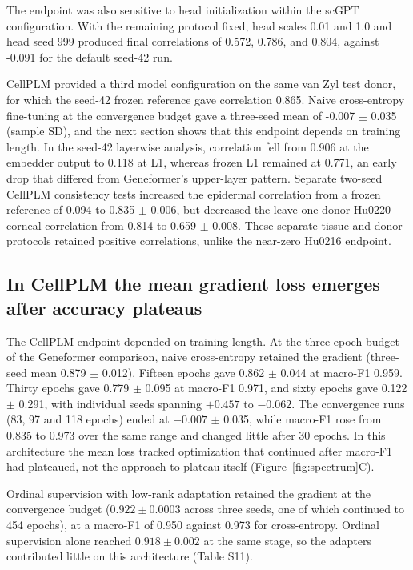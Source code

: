 \documentclass[12pt,letterpaper]{article}
\begin{document}
The endpoint was also sensitive to head initialization within the scGPT configuration. With the remaining protocol fixed, head scales 0.01 and 1.0 and head seed 999 produced final correlations of 0.572, 0.786, and 0.804, against -0.091 for the default seed-42 run.

CellPLM provided a third model configuration on the same van Zyl test donor, for which the seed-42 frozen reference gave correlation 0.865. Naive cross-entropy fine-tuning at the convergence budget gave a three-seed mean of -0.007 $\pm$ 0.035 (sample SD), and the next section shows that this endpoint depends on training length. In the seed-42 layerwise analysis, correlation fell from 0.906 at the embedder output to 0.118 at L1, whereas frozen L1 remained at 0.771, an early drop that differed from Geneformer's upper-layer pattern. Separate two-seed CellPLM consistency tests increased the epidermal correlation from a frozen reference of 0.094 to 0.835 $\pm$ 0.006, but decreased the leave-one-donor Hu0220 corneal correlation from 0.814 to 0.659 $\pm$ 0.008. These separate tissue and donor protocols retained positive correlations, unlike the near-zero Hu0216 endpoint.

\subsection*{In CellPLM the mean gradient loss emerges after accuracy plateaus}

The CellPLM endpoint depended on training length. At the three-epoch budget of the Geneformer comparison, naive cross-entropy retained the gradient (three-seed mean 0.879 $\pm$ 0.012). Fifteen epochs gave 0.862 $\pm$ 0.044 at macro-F1 0.959. Thirty epochs gave 0.779 $\pm$ 0.095 at macro-F1 0.971, and sixty epochs gave 0.122 $\pm$ 0.291, with individual seeds spanning $+0.457$ to $-0.062$. The convergence runs (83, 97 and 118 epochs) ended at $-0.007$ $\pm$ 0.035, while macro-F1 rose from 0.835 to 0.973 over the same range and changed little after 30 epochs. In this architecture the mean loss tracked optimization that continued after macro-F1 had plateaued, not the approach to plateau itself (Figure~\ref{fig:spectrum}C).

Ordinal supervision with low-rank adaptation retained the gradient at the convergence budget ($0.922 \pm 0.0003$ across three seeds, one of which continued to 454 epochs), at a macro-F1 of 0.950 against 0.973 for cross-entropy. Ordinal supervision alone reached $0.918 \pm 0.002$ at the same stage, so the adapters contributed little on this architecture (Table S11).
\end{document}

